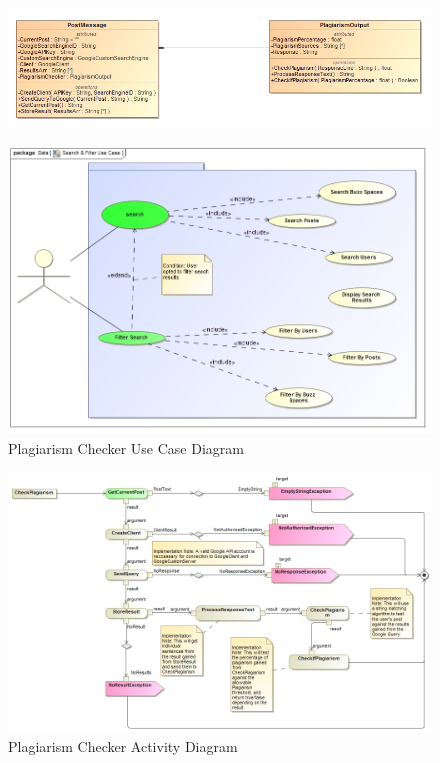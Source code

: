 \documentclass[11pt]{article}
\begin{document}
\begin{enumerate}
\begin{itemize}
\begin{figure}[H]
    				\includegraphics[scale=0.5]{InputOutput.jpg}
				\end{figure}
				\begin{figure}[H]
					\caption{Plagiarism Checker Use Case Diagram}
		    		\includegraphics[scale=0.4]{UseCase.jpg}
				\end{figure}
				\begin{figure}[H]
					\caption{Plagiarism Checker Activity Diagram}
    				\includegraphics[scale=0.4]{Activity.jpg}
				\end{figure}
	  	\end{itemize}


\end{enumerate}
\end{document}
